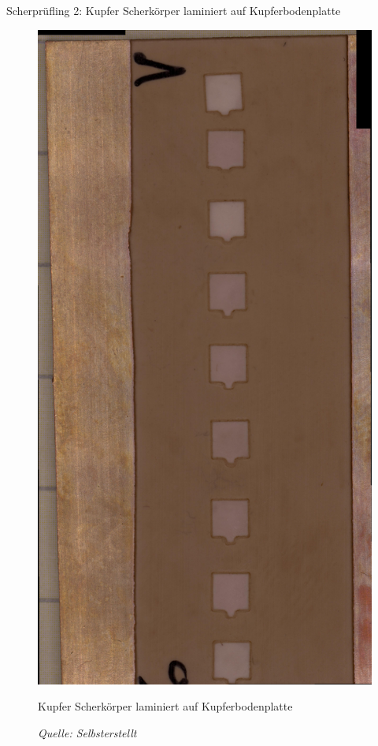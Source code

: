 Scherprüfling 2: Kupfer Scherkörper laminiert auf Kupferbodenplatte
\vspace{0.1cm}
\begin{figure}[h]
    \centering
    \includegraphics[scale=0.06, angle=90]{Bilder/Laminieren_Bodenplatte_Gesamt.jpg}
    \caption{Kupfer Scherkörper laminiert auf Kupferbodenplatte}
    \caption*{\textit{Quelle: Selbsterstellt}}
    \vspace{0.2cm}
    \label{Abb.3: Kupfer Scherkörper laminiert auf Kupferbodenplatte}
\end{figure}
\newpage
